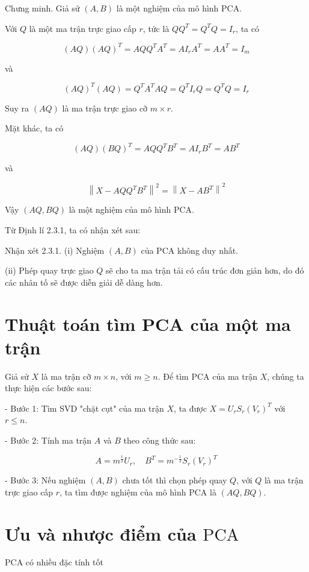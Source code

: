 \documentclass[12pt,a4paper,oneside]{report}
\numberwithin{equation}{section}
\begin{document}
Chưng minh. Giả sử $(A, B)$ là một nghiệm của mô hình $\mathrm{PCA}$.

Với $Q$ là một ma trận trực giao cấp $r$, tức là $Q Q^{T}=Q^{T} Q=I_{r}$, ta có

$$
(A Q)(A Q)^{T}=A Q Q^{T} A^{T}=A I_{r} A^{T}=A A^{T}=I_{m}
$$

và

$$
(A Q)^{T}(A Q)=Q^{T} A^{T} A Q=Q^{T} I_{r} Q=Q^{T} Q=I_{r}
$$

Suy ra $(A Q)$ là ma trận trực giao cỡ $m \times r$.

Mặt khác, ta có

$$
(A Q)(B Q)^{T}=A Q Q^{T} B^{T}=A I_{r} B^{T}=A B^{T}
$$

và

$$
\left\|X-A Q Q^{T} B^{T}\right\|^{2}=\left\|X-A B^{T}\right\|^{2}
$$

Vậy $(A Q, B Q)$ là một nghiệm của mô hình $\mathrm{PCA}$.

Từ Định lí 2.3.1, ta có nhận xét sau:

Nhận xét 2.3.1. (i) Nghiệm $(A, B)$ của PCA không duy nhất.

(ii) Phép quay trực giao $Q$ sẽ cho ta ma trận tải có cấu trúc đơn giản hơn, do đó các nhân tố sẽ được diễn giải dễ dàng hơn.

\section{Thuật toán tìm PCA của một ma trận}

Giả sử $X$ là ma trận cỡ $m \times n$, với $m \geq n$. Để tìm $\mathrm{PCA}$ của ma trận $X$, chúng ta thực hiện các bước sau:

- Bước 1: Tìm SVD "chặt cụt" của ma trận $X$, ta được $X=U_{r} S_{r}\left(V_{r}\right)^{T}$ với $r \leq n$.

- Bước 2: Tính ma trận $A$ và $B$ theo công thức sau:

$$
A=m^{\frac{1}{2}} U_{r}, \quad B^{T}=m^{-\frac{1}{2}} S_{r}\left(V_{r}\right)^{T}
$$

- Bước 3: Nếu nghiệm $(A, B)$ chưa tốt thì chọn phép quay $Q$, với $Q$ là ma trận trực giao cấp $r$, ta tìm được nghiệm của mô hình $\mathrm{PCA}$ là $(A Q, B Q)$.

\section{Ưu và nhược điểm của $\mathrm{PCA}$}
PCA có nhiều đặc tính tốt
\end{document}
